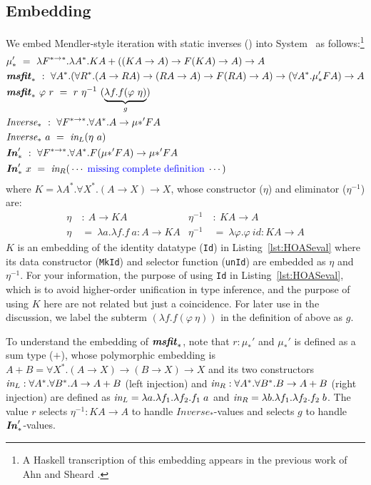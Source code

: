 \subsection{Embedding \msfit{*}}
We embed Mendler-style iteration with static inverses (\msfit{*})
into System \Fw\ as follows:\footnote{A Haskell transcription of this embedding
	appears in the previous work of Ahn and Sheard \cite{AhnShe11}.}
\begin{align*}
&\mu_{*}' ~=~ \lambda F^{* \to *}.\lambda A^{*}.
		K A + ((K A \to A) \to F(K A) \to A) \to A
	\\
&\textbf{\textit{msfit}}_{*} ~:~ \forall A^{*}.
	(\forall R^{*}.(A \to R A) \to (R A \to A) \to F(R A) \to A) \to
	(\forall A^{*}.\mu_{*}' F A) \to A \\
&\textbf{\textit{msfit}}_{*}~\varphi~r ~=~ r~\eta^{-1}~(\underbrace{\lambda f.f(\varphi~\eta)}_g)
	\\
&\textit{Inverse}_{*} ~:~ \forall F^{*\to*}.\forall A^{*}.A \to \mu{*}' F A \\
&\textit{Inverse}_{*}~a ~=~ \textit{in}_{L} (\eta~a)
	\\
&\textbf{\textit{In}}_{*}' ~:~ \forall F^{*\to*}.\forall A^{*}.F(\mu{*}' F A) \to \mu{*}' F A \\
&\textbf{\textit{In}}_{*}'~x ~=~ \textit{in}_{R}(\,\cdots\;\text{\color{blue}missing complete definition}\;\cdots)
\end{align*}
where $K = \lambda A^{*}.\forall X^{*}.(A \to X) \to X$,
whose constructor ($\eta$) and eliminator ($\eta^{-1}$) are:
\begin{align*}
\eta &~:~ A \to KA &
\eta^{-1} &~:~ KA \to A \\
\eta &~=~ \lambda a.\lambda f.f~a : A \to KA &
\eta^{-1} &~=~ \lambda \varphi.\varphi~\textit{id} : KA \to A
\end{align*}
$K$ is an embedding of the identity datatype (\lstinline{Id})
in Listing~\ref{lst:HOASeval} where its data constructor (\lstinline{MkId}) and
selector function (\lstinline{unId}) are embedded as $\eta$ and $\eta^{-1}$.
For your information, the purpose of using \lstinline{Id}
in Listing~\ref{lst:HOASeval}, which is to avoid higher-order unification
in type inference, and the purpose of using $K$ here are not related but
just a coincidence. For later use in the discussion, we label the subterm
$(\lambda f.f(\varphi~\eta))$ in the definition of \msfit{*} above as $g$.

To understand the embedding of $\textbf{\textit{msfit}}_{*}$, note that $r : \mu_{*}'$ and
$\mu_{*}'$ is defined as a sum type ($+$), whose polymorphic embedding is
$A + B = \forall X^{*}.(A \to X) \to (B \to X) \to X$ and its two constructors
$\textit{in}_{L} : \forall A^{*}.\forall B^{*}.A \to A + B$ (left injection) and
$\textit{in}_{R} : \forall A^{*}.\forall B^{*}.B \to A + B$ (right injection) are
defined as $\textit{in}_{L} = \lambda a.\lambda f_1.\lambda f_2.f_1\;a$ and
$\textit{in}_{R} = \lambda b.\lambda f_1.\lambda f_2.f_2\;b$. The value $r$ selects
$\eta^{-1} : KA \to A$ to handle $\textit{Inverse}_{*}$-values and selects
$g$ to handle $\textbf{\textit{In}}_{*}'$-values.


